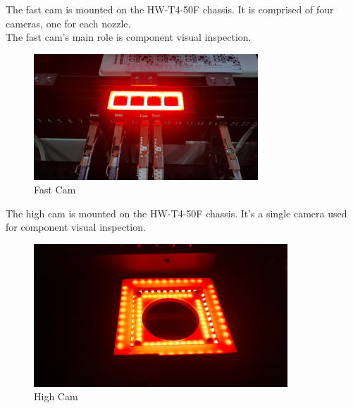 \documentclass[a4paper,10pt]{report}
\begin{document}
The fast cam is mounted on the HW-T4-50F chassis. It is comprised of four cameras, one for each nozzle.\\
The fast cam's main role is component visual inspection.
\begin{figure}[!htb]
 \centering
 \includegraphics[width=0.75\textwidth]{fcam.jpg}
 \caption{Fast Cam}
\end{figure}

\newpage
The high cam is mounted on the HW-T4-50F chassis. It's a single camera used for component visual inspection.\\
\begin{figure}[!htb]
 \centering
 \includegraphics[width=0.85\textwidth]{hcam.jpg}
 \caption{High Cam}
\end{figure}


\newpage
\end{document}

